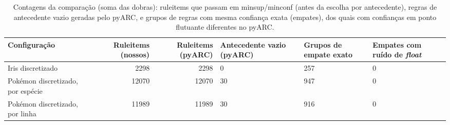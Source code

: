 \documentclass[a4paper,11pt]{article}
\begin{document}
\begin{table}[htbp]
\centering
\small
\caption{Contagens da comparação (soma das dobras): ruleitems que passam em minsup/minconf (antes da escolha por antecedente), regras de antecedente vazio geradas pelo pyARC, e grupos de regras com mesma confiança exata (empates), dos quais com confianças em ponto flutuante diferentes no pyARC.}
\label{tab:pyarc_contagens}
\begin{tabular}{p{3.4cm}rrp{1.9cm}p{1.7cm}p{2.2cm}}
\toprule
Configuração & Ruleitems (nossos) & Ruleitems (pyARC) & Antecedente vazio (pyARC) & Grupos de empate exato & Empates com ruído de \emph{float} \\
\midrule
Iris discretizado & 2298 & 2298 & 0 & 257 & 0 \\
Pokémon discretizado, por espécie & 12070 & 12070 & 30 & 947 & 0 \\
Pokémon discretizado, por linha & 11989 & 11989 & 30 & 916 & 0 \\
\bottomrule
\end{tabular}
\end{table}
\end{document}
